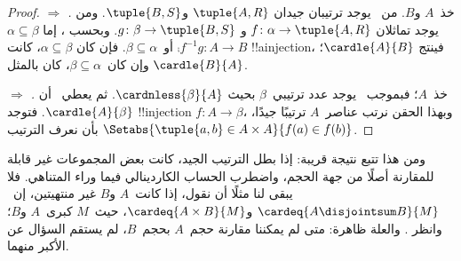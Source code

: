 \documentclass[../../../include/open-logic-section]{subfiles}
\begin{document}
\begin{proof}
\emph{ $\Rightarrow$ .} خذ~$A$
و$B$. من~ يوجد ترتيبان جيدان
$\tuple{A, R}$ و$\tuple{B, S}$. ومن
 يوجد تماثلان
$f \colon \alpha \to \tuple{A, R}$ و
$g \colon \beta \to \tuple{B, S}$. وبحسب
، إما
$\alpha \subseteq \beta$ أو~$\beta \subseteq \alpha$. فإن كان
$\alpha \subseteq \beta$، كانت
$\comp{f^{-1}}{g} \colon A \to B$ !!a{injection}، فينتج
$\cardle{A}{B}$؛ وإن كان~$\beta \subseteq \alpha$، كان بالمثل
$\cardle{B}{A}$.

\emph{ $\Rightarrow$ .} خذ~$A$؛
فبموجب~ يوجد عدد ترتيبي~$\beta$ بحيث
$\cardnless{\beta}{A}$. ثم يعطي~ أن
$\cardle{A}{\beta}$. فتوجد !!{injection}
$f \colon A \to \beta$، وبهذا الحقن نرتب عناصر~$A$ ترتيبًا جيدًا،
بأن نعرف الترتيب
$\Setabs{\tuple{a, b} \in A \times A}{f(a) \in f(b)}$.
\end{proof}
\noindent
ومن هذا تتبع نتيجة قريبة: إذا بطل الترتيب الجيد، كانت بعض المجموعات غير
قابلة للمقارنة أصلًا من جهة الحجم، واضطرب الحساب الكاردينالي فيما وراء
المتناهي. فلا يبقى لنا مثلًا أن نقول، إذا كانت~$A$ و$B$ غير منتهيتين،
إن~$\cardeq{A \disjointsum B}{M}$ و$\cardeq{A \times B}{M}$، حيث~$M$
كبرى~$A$ و$B$؛ وانظر
. والعلة ظاهرة: متى لم
يمكننا مقارنة حجم~$A$ بحجم~$B$، لم يستقم السؤال عن الأكبر منهما.
\end{document}
